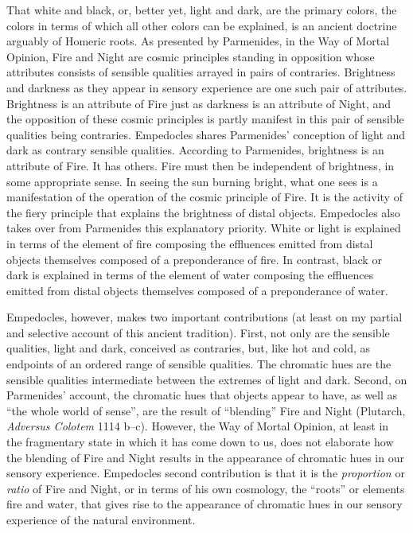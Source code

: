That white and black, or, better yet, light and dark, are the primary colors, the colors in terms of which all other colors can be explained, is an ancient doctrine arguably of Homeric roots. As presented by Parmenides, in the Way of Mortal Opinion, Fire and Night are cosmic principles standing in opposition whose attributes consists of sensible qualities arrayed in pairs of contraries. Brightness and darkness as they appear in sensory experience are one such pair of attributes. Brightness is an attribute of Fire just as darkness is an attribute of Night, and the opposition of these cosmic principles is partly manifest in this pair of sensible qualities being contraries. Empedocles shares Parmenides' conception of light and dark as contrary sensible qualities. According to Parmenides, brightness is an attribute of Fire. It has others. Fire must then be independent of brightness, in some appropriate sense. In seeing the sun burning bright, what one sees is a manifestation of the operation of the cosmic principle of Fire. It is the activity of the fiery principle that explains the brightness of distal objects. Empedocles also takes over from Parmenides this explanatory priority. White or light is explained in terms of the element of fire composing the effluences emitted from distal objects themselves composed of a preponderance of fire. In contrast, black or dark is explained in terms of the element of water composing the effluences emitted from distal objects themselves composed of a preponderance of water. 

Empedocles, however, makes two important contributions (at least on my partial and selective account of this ancient tradition). First, not only are the sensible qualities, light and dark, conceived as contraries, but, like hot and cold, as endpoints of an ordered range of sensible qualities. The chromatic hues are the sensible qualities intermediate between the extremes of light and dark. Second, on Parmenides' account, the chromatic hues that objects appear to have, as well as ``the whole world of sense'', are the result of ``blending'' Fire and Night (Plutarch, \emph{Adversus Colotem} 1114 b--c). However, the Way of Mortal Opinion, at least in the fragmentary state in which it has come down to us, does not elaborate how the blending of Fire and Night results in the appearance of chromatic hues in our sensory experience. Empedocles second contribution is that it is the \emph{proportion} or \emph{ratio} of Fire and Night, or in terms of his own cosmology, the ``roots'' or elements fire and water, that gives rise to the appearance of chromatic hues in our sensory experience of the natural environment. 

